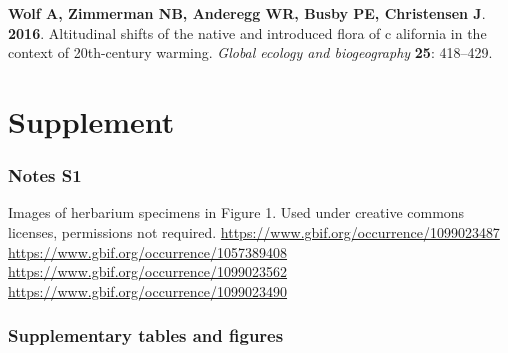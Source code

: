 \documentclass[man,floatsintext]{apa6}
\theoremstyle{definition}
\theoremstyle{definition}
\theoremstyle{definition}
\theoremstyle{remark}
\begin{document}
\leavevmode\hypertarget{ref-wolf2016altitudinal}{}%
\textbf{\textnormal{Wolf A}, \textnormal{Zimmerman NB},
\textnormal{Anderegg WR}, \textnormal{Busby PE}, \textnormal{Christensen
J}}. \textbf{2016}. Altitudinal shifts of the native and introduced
flora of c alifornia in the context of 20th-century warming.
\emph{Global ecology and biogeography} \textbf{25}: 418--429.

\endgroup

\newpage
\setcounter{table}{0}  \renewcommand{\thetable}{S\arabic{table}} \setcounter{figure}{0} \renewcommand{\thefigure}{S\arabic{figure}}

\hypertarget{supplement}{%
\section{Supplement}\label{supplement}}

\hypertarget{notes-s1}{%
\subsubsection{Notes S1}\label{notes-s1}}

Images of herbarium specimens in Figure 1. Used under creative commons
licenses, permissions not required.
\url{https://www.gbif.org/occurrence/1099023487}\\
\url{https://www.gbif.org/occurrence/1057389408}~\\
\url{https://www.gbif.org/occurrence/1099023562}~\\
\url{https://www.gbif.org/occurrence/1099023490}

\hypertarget{supplementary-tables-and-figures}{%
\subsubsection{Supplementary tables and
figures}\label{supplementary-tables-and-figures}}

\newpage
\end{document}
